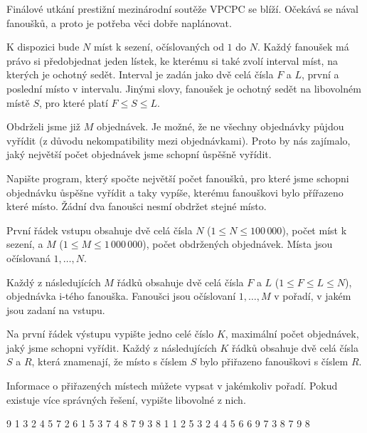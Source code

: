 





Finálové utkání prestižní mezinárodní soutěže VPCPC se blíží.
Očekává se nával fanoušků, a proto je potřeba věci dobře naplánovat.

K dispozici bude $N$ míst k sezení, očíslovaných od $1$ do $N$.
Každý fanoušek má právo si předobjednat jeden lístek, ke kterému si také zvolí interval míst, na kterých je ochotný sedět.
Interval je zadán jako dvě celá čísla $F$ a $L$, první a poslední místo v intervalu.
Jinými slovy, fanoušek je ochotný sedět na libovolném místě $S$, pro které platí $F \leq S \leq L$.

Obdrželi jsme již $M$ objednávek.
Je možné, že ne všechny objednávky půjdou vyřídit (z důvodu nekompatibility mezi objednávkami).
Proto by nás zajímalo, jaký největší počet objednávek jsme schopní ůspěšně vyřídit.


Napište program, který spočte největší počet fanoušků, pro které jsme schopni objednávku ůspěšne vyřídit a taky vypíše, kterému fanouškovi bylo přířazeno které místo.
Žádní dva fanoušci nesmí obdržet stejné místo.


První řádek vstupu obsahuje dvě celá čísla $N$ ($1 \leq N \leq 100\,000$), počet míst k sezení, a $M$ ($1 \leq M \leq 1\,000\,000$), počet obdržených objednávek. Místa jsou očíslovaná $1,\ldots,N$.

Každý z následujících $M$ řádků obsahuje dvě celá čísla $F$ a $L$ ($1 \leq F \leq L \leq N$), objednávka i-tého fanouška.
Fanoušci jsou očíslovaní $1,\ldots,M$ v pořadí, v jakém jsou zadaní na vstupu.


Na první řádek výstupu vypište jedno celé číslo $K$, maximální počet objednávek, jaký jsme schopni vyřídit.
Každý z následujících $K$ řádků obsahuje dvě celá čísla $S$ a $R$, která znamenají, že místo s číslem $S$ bylo přiřazeno fanouškovi s číslem $R$.

Informace o přiřazených místech můžete vypsat v jakémkoliv pořadí.
Pokud existuje více správných řešení, vypište libovolné z nich.

 9
1 3
2 4
5 7
2 6
1 5
3 7
4 8
7 9
3 8
1 1
2 5
3 2
4 4
5 6
6 9
7 3
8 7
9 8
\sampleCOMMENT

\sampleEND
\bigskip


